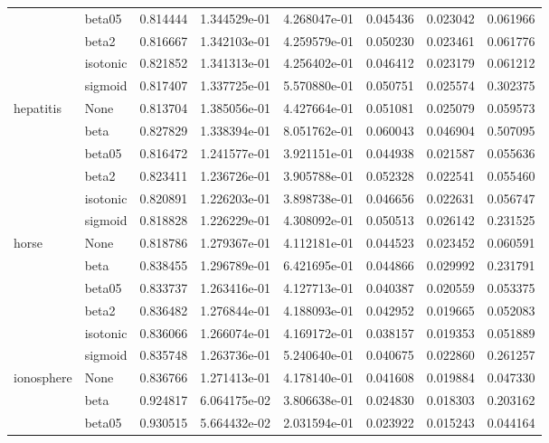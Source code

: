 \begin{tabular}{llrrrrrr}
        & beta05 &  0.814444 &  1.344529e-01 &  4.268047e-01 &  0.045436 &  0.023042 &  0.061966 \\
        & beta2 &  0.816667 &  1.342103e-01 &  4.259579e-01 &  0.050230 &  0.023461 &  0.061776 \\
        & isotonic &  0.821852 &  1.341313e-01 &  4.256402e-01 &  0.046412 &  0.023179 &  0.061212 \\
        & sigmoid &  0.817407 &  1.337725e-01 &  5.570880e-01 &  0.050751 &  0.025574 &  0.302375 \\
hepatitis & None &  0.813704 &  1.385056e-01 &  4.427664e-01 &  0.051081 &  0.025079 &  0.059573 \\
        & beta &  0.827829 &  1.338394e-01 &  8.051762e-01 &  0.060043 &  0.046904 &  0.507095 \\
        & beta05 &  0.816472 &  1.241577e-01 &  3.921151e-01 &  0.044938 &  0.021587 &  0.055636 \\
        & beta2 &  0.823411 &  1.236726e-01 &  3.905788e-01 &  0.052328 &  0.022541 &  0.055460 \\
        & isotonic &  0.820891 &  1.226203e-01 &  3.898738e-01 &  0.046656 &  0.022631 &  0.056747 \\
        & sigmoid &  0.818828 &  1.226229e-01 &  4.308092e-01 &  0.050513 &  0.026142 &  0.231525 \\
horse & None &  0.818786 &  1.279367e-01 &  4.112181e-01 &  0.044523 &  0.023452 &  0.060591 \\
        & beta &  0.838455 &  1.296789e-01 &  6.421695e-01 &  0.044866 &  0.029992 &  0.231791 \\
        & beta05 &  0.833737 &  1.263416e-01 &  4.127713e-01 &  0.040387 &  0.020559 &  0.053375 \\
        & beta2 &  0.836482 &  1.276844e-01 &  4.188093e-01 &  0.042952 &  0.019665 &  0.052083 \\
        & isotonic &  0.836066 &  1.266074e-01 &  4.169172e-01 &  0.038157 &  0.019353 &  0.051889 \\
        & sigmoid &  0.835748 &  1.263736e-01 &  5.240640e-01 &  0.040675 &  0.022860 &  0.261257 \\
ionosphere & None &  0.836766 &  1.271413e-01 &  4.178140e-01 &  0.041608 &  0.019884 &  0.047330 \\
        & beta &  0.924817 &  6.064175e-02 &  3.806638e-01 &  0.024830 &  0.018303 &  0.203162 \\
        & beta05 &  0.930515 &  5.664432e-02 &  2.031594e-01 &  0.023922 &  0.015243 &  0.044164 \\

\end{tabular}
